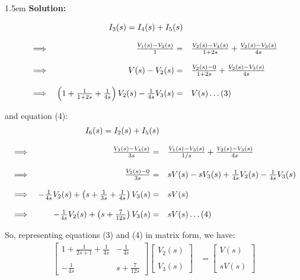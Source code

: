 \documentclass{article}
\newenvironment{solution}{
	\vspace{.5em}
	\par
	\begin{adjustwidth}{1.5em}{}
	\textbf{{Solution:}}
	\par
	\vspace{.5em}
}{
	\vspace{1em}
	\end{adjustwidth}
}
\begin{document}
\begin{solution}
	\begin{equation*}
		\begin{array}{lrl}
			& I_3(s) = I_4(s) + I_5(s) \\\\
			\implies & \frac{V_1(s) - V_2(s)}{1} =& \frac{V_2(s) - V_4(s)}{1 + 2s} + \frac{V_2(s) - V_3(s)}{4s} \\\\
			\implies & V(s) - V_2(s) =& \frac{V_2(s) - 0}{1 + 2s} + \frac{V_2(s) - V_3(s)}{4s} \\\\
			\implies & \left(1 + \frac{1}{1 + 2s} + \frac{1}{4s}\right)V_2(s) - \frac{1}{4s}V_3(s) =& V(s) \ldots (3) \\
		\end{array} \\
	\end{equation*}

	and equation (4): \\

	\begin{equation*}
		\begin{array}{lrl}
			& I_6(s) = I_2(s) + I_5(s) \\\\
			\implies & \frac{V_3(s) - V_4(s)}{3s} =& \frac{V_1(s) - V_3(s)}{1/s} + \frac{V_2(s) - V_3(s)}{4s} \\\\
			\implies & \frac{V_3(s) - 0}{3s} =& sV(s) - sV_3(s) + \frac{1}{4s}V_2(s) - \frac{1}{4s}V_3(s) \\\\
			\implies & -\frac{1}{4s}V_2(s) + \left(s + \frac{1}{3s} + \frac{1}{4s} \right)V_3(s) =& sV(s) \\\\
			\implies & -\frac{1}{4s}V_2(s) + \left(s + \frac{7}{12s}\right)V_3(s) =& sV(s) \ldots (4) \\
		\end{array} \\
	\end{equation*}

	So, representing equations (3) and (4) in matrix form, we have: \\

	\begin{align*}
		\begin{bmatrix} 1 + \tfrac{1}{2s + 1} + \tfrac{1}{4s} & -\tfrac{1}{4s} \\\\ -\tfrac{1}{4s} & s + \tfrac{7}{12s} \end{bmatrix} \begin{bmatrix} V_2(s) \\\\ V_3(s) \end{bmatrix} &= \begin{bmatrix} V(s) \\\\ sV(s) \end{bmatrix} \\
	\end{align*}


\end{solution}
\end{document}
